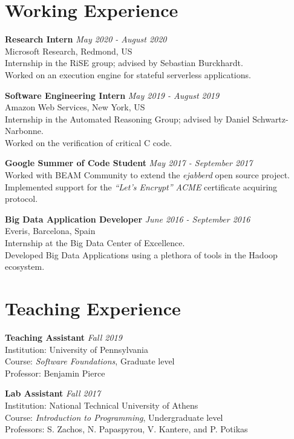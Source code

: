 \documentclass[margin]{res}
\begin{document}
\begin{resume}
\section{Working Experience}

\textbf{Research Intern}  \hfill {\em May 2020 - August 2020} \\
Microsoft Research, Redmond, US \\
Internship in the RiSE group; advised by Sebastian Burckhardt. \\
Worked on an execution engine for stateful serverless applications.

\textbf{Software Engineering Intern}  \hfill {\em May 2019 - August 2019} \\
Amazon Web Services, New York, US \\
Internship in the Automated Reasoning Group; advised by Daniel Schwartz-Narbonne. \\
Worked on the verification of critical C code.

\textbf{Google Summer of Code Student}  \hfill {\em May 2017 - September 2017} \\
Worked with BEAM Community to extend the \textit{ejabberd} open source project. \\
Implemented support for the \textit{``Let's Encrypt'' ACME} certificate acquiring protocol.

\textbf{Big Data Application Developer}  \hfill {\em June 2016 - September 2016} \\
Everis, Barcelona, Spain \\
Internship at the Big Data Center of Excellence. \\
Developed Big Data Applications using a plethora of tools in the Hadoop ecosystem.




\section{Teaching Experience}

\textbf{Teaching Assistant}  \hfill {\em Fall 2019} \\
Institution: University of Pennsylvania \\
Course: \textit{Software Foundations}, Graduate level \\
Professor: Benjamin Pierce

\textbf{Lab Assistant}  \hfill {\em Fall 2017} \\
Institution: National Technical University of Athens \\
Course: \textit{Introduction to Programming}, Undergraduate level \\
Professors: S. Zachos, N. Papaspyrou, V. Kantere, and P. Potikas


\end{resume}
\end{document}

